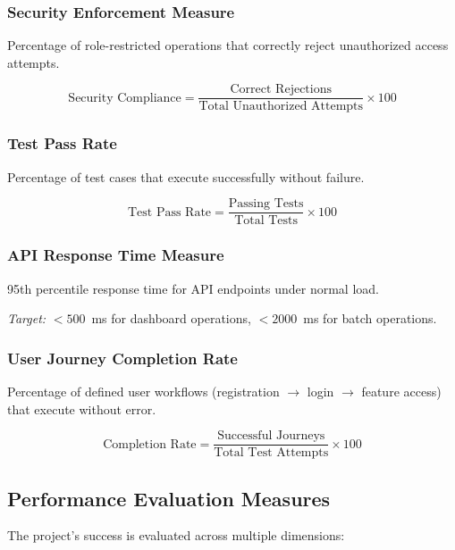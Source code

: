 \documentclass[11pt,a4paper]{article}
\begin{document}
\subsubsection{Security Enforcement Measure}

Percentage of role-restricted operations that correctly reject unauthorized access attempts.

\begin{equation}
\text{Security Compliance} = \frac{\text{Correct Rejections}}{\text{Total Unauthorized Attempts}} \times 100
\end{equation}

\subsubsection{Test Pass Rate}

Percentage of test cases that execute successfully without failure.

\begin{equation}
\text{Test Pass Rate} = \frac{\text{Passing Tests}}{\text{Total Tests}} \times 100
\end{equation}

\subsubsection{API Response Time Measure}

95th percentile response time for API endpoints under normal load.

\textit{Target:} $<500$~ms for dashboard operations, $<2000$~ms for batch operations.

\subsubsection{User Journey Completion Rate}

Percentage of defined user workflows (registration $\to$ login $\to$ feature access) that execute without error.

\begin{equation}
\text{Completion Rate} = \frac{\text{Successful Journeys}}{\text{Total Test Attempts}} \times 100
\end{equation}

\subsection{Performance Evaluation Measures}

The project's success is evaluated across multiple dimensions:
\end{document}

